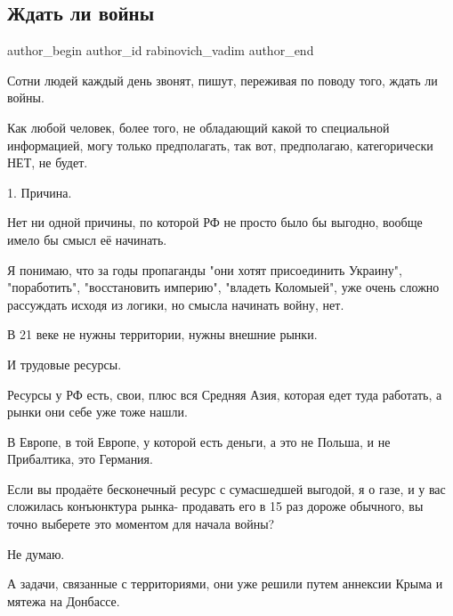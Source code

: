  
 
 
 
 
 
\subsection{Ждать ли войны}
\label{sec:25_01_2022.fb.rabinovich_vadim.1.zhdat_li_vojny}
 
\ifcmt
 author_begin
   author_id rabinovich_vadim
 author_end
\fi

Сотни людей каждый день звонят, пишут, переживая по поводу того, ждать ли
войны.

Как любой человек, более того, не обладающий какой то специальной информацией,
могу только предполагать, так вот, предполагаю, категорически НЕТ, не будет.

 1.  Причина.

 Нет ни одной причины, по которой РФ не просто было бы выгодно, вообще имело бы
 смысл её начинать.

Я понимаю, что за годы пропаганды "они хотят присоединить Украину",
"поработить", "восстановить империю", "владеть Коломыей", уже очень сложно
рассуждать исходя из логики, но смысла начинать войну, нет.

В 21 веке не нужны территории, нужны внешние рынки.

И трудовые ресурсы.

Ресурсы у РФ есть, свои, плюс вся Средняя Азия, которая едет туда работать, а
рынки они себе уже тоже нашли.

В Европе, в той Европе, у которой есть деньги, а это не Польша, и не
Прибалтика, это Германия.

Если вы продаёте бесконечный ресурс с сумасшедшей выгодой, я о газе, и у вас
сложилась конъюнктура рынка- продавать его в 15 раз дороже обычного, вы точно
выберете это моментом для начала войны?

Не думаю.

А задачи, связанные с территориями, они уже решили путем аннексии Крыма и
мятежа на Донбассе.

